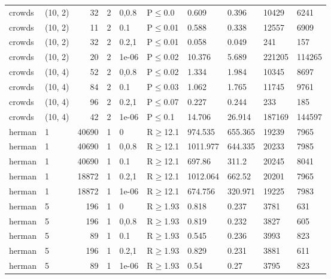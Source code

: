 \begin{longtable}{llrrllllll}
 crowds        & (10, 2)  &     	32 &   2 & 0,0.8 & P$\leq$0.0   & 0.609    & 0.396    & 10429   & 6241   \\
 crowds        & (10, 2)  &     	11 &   2 & 0.1   & P$\leq$0.01  & 0.588    & 0.338    & 12557   & 6909   \\
 crowds        & (10, 2)  &     	32 &   2 & 0.2,1 & P$\leq$0.01  & 0.058    & 0.049    & 241     & 157    \\
 crowds        & (10, 2)  &     	20 &   2 & 1e-06 & P$\leq$0.02  & 10.376   & 5.689    & 221205  & 114265 \\
 crowds        & (10, 4)  &     	52 &   2 & 0,0.8 & P$\leq$0.02  & 1.334    & 1.984    & 10345   & 8697   \\
 crowds        & (10, 4)  &     	84 &   2 & 0.1   & P$\leq$0.03  & 1.062    & 1.765    & 11745   & 9761   \\
 crowds        & (10, 4)  &     	96 &   2 & 0.2,1 & P$\leq$0.07  & 0.227    & 0.244    & 233     & 185    \\
 crowds        & (10, 4)  &     	42 &   2 & 1e-06 & P$\leq$0.1   & 14.706   & 26.914   & 187169  & 144597 \\
 herman        & 1        &  	40690 &   1 & 0     & R$\geq$12.1  & 974.535  & 655.365  & 19239   & 7965   \\
 herman        & 1        &  	40690 &   1 & 0,0.8 & R$\geq$12.1  & 1011.977 & 644.335  & 20233   & 7985   \\
 herman        & 1        &  	40690 &   1 & 0.1   & R$\geq$12.1  & 697.86   & 311.2    & 20245   & 8041   \\
 herman        & 1        &  	18872 &   1 & 0.2,1 & R$\geq$12.1  & 1012.064 & 662.52   & 20201   & 7965   \\
 herman        & 1        &  	18872 &   1 & 1e-06 & R$\geq$12.1  & 674.756  & 320.971  & 19225   & 7983   \\
 herman        & 5        &    	196 &   1 & 0     & R$\geq$1.93  & 0.818    & 0.237    & 3781    & 631    \\
 herman        & 5        &    	196 &   1 & 0,0.8 & R$\geq$1.93  & 0.819    & 0.232    & 3827    & 605    \\
 herman        & 5        &     	89 &   1 & 0.1   & R$\geq$1.93  & 0.545    & 0.236    & 3993    & 823    \\
 herman        & 5        &    	196 &   1 & 0.2,1 & R$\geq$1.93  & 0.829    & 0.231    & 3881    & 611    \\
 herman        & 5        &     	89 &   1 & 1e-06 & R$\geq$1.93  & 0.54     & 0.27     & 3795    & 823    \\

\end{longtable}
